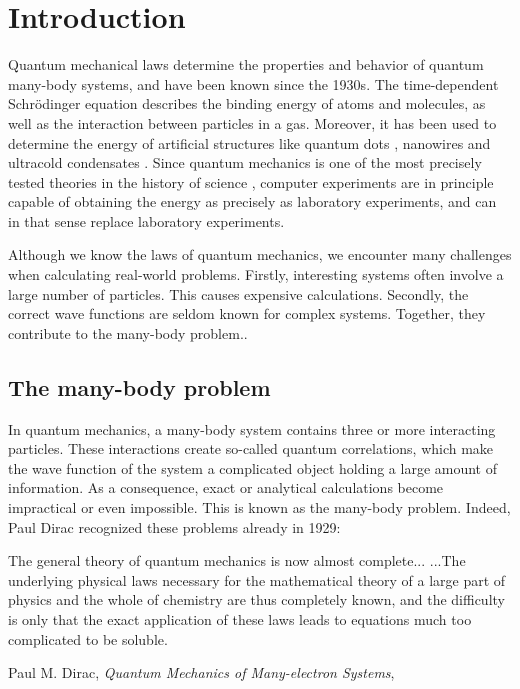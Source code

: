 \chapter{Introduction}
Quantum mechanical laws determine the properties and behavior of quantum many-body systems, and have been known since the 1930s. The time-dependent Schrödinger equation describes the binding energy of atoms and molecules, as well as the interaction between particles in a gas. Moreover, it has been used to determine the energy of artificial structures like quantum dots \supercite{reimann_electronic_2002}, nanowires \supercite{wang_a_three_2004} and ultracold condensates \supercite{dubois_bose-einstein_2001}. Since quantum mechanics is one of the most precisely tested theories in the history of science \supercite{odom_new_2006}, computer experiments are in principle capable of obtaining the energy as precisely as laboratory experiments, and can in that sense replace laboratory experiments.

Although we know the laws of quantum mechanics, we encounter many challenges when calculating real-world problems. Firstly, interesting systems often involve a large number of particles. This causes expensive calculations. Secondly, the correct wave functions are seldom known for complex systems. Together, they contribute to the many-body problem..

\section{The many-body problem}
In quantum mechanics, a many-body system contains three or more interacting particles. These interactions create so-called quantum correlations, which make the wave function of the system a complicated object holding a large amount of information. As a consequence, exact or analytical calculations become impractical or even impossible. This is known as the many-body problem. Indeed, Paul Dirac recognized these problems already in 1929:

\begin{shadequote}{
		The general theory of quantum mechanics is now almost complete... ...The underlying physical laws necessary for the mathematical theory of a large part of physics and the whole of chemistry are thus completely known, and the difficulty is only that the exact application of these laws leads to equations much too complicated to be soluble. \par Paul M. Dirac, \emph{Quantum Mechanics of Many-electron Systems}, \supercite{dirac_paul_adrien_maurice_quantum_1929}}
\end{shadequote}

